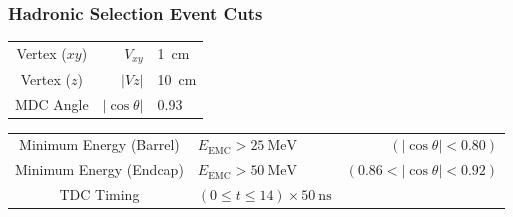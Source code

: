 \documentclass[t]{beamer}
\newcommand{\addframe}[2]{
\begin{frame}
\frametitle{#1}
#2
\end{frame}
}
\newcommand{\additem}[1]{
\begin{itemize}
\item #1
\end{itemize}
}
\begin{document}
{{}




\addframe{Hadronic Selection Event Cuts}{

\begin{table}
\footnotesize
\centering
\renewcommand\arraystretch{1.0}
\begin{tabular}{c| r@{$\; < \;$}l}
\hline
Vertex ($xy$) & $V_{xy}$ & \pp \SI{1}{\cm} \\
Vertex ($z$)  & $|Vz|$   & \SI{10}{\cm} \\
MDC Angle & $|\cos\theta|$ & 0.93 \\
\hline
\end{tabular}
\end{table}

\begin{table}
\footnotesize
\centering
\renewcommand\arraystretch{1.0}
\begin{tabular}{c|l r}
\hline
Minimum Energy (Barrel) & $E_{\text{EMC}} > \SI{25}{\MeV}$ & $(|\cos\theta| < 0.80)$ \\
Minimum Energy (Endcap) & $E_{\text{EMC}} > \SI{50}{\MeV}$ & $(0.86 < |\cos\theta| < 0.92)$ \\
TDC Timing & $(0 \leq t \leq 14) \times \SI{50}{\ns}$ & \\
\hline
\end{tabular}
\end{table}


}}
\end{document}
